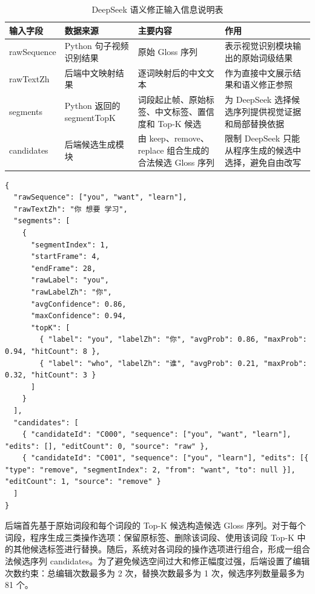 \begin{longtable}{L{0.20\textwidth} L{0.24\textwidth} L{0.28\textwidth} L{0.20\textwidth}}
  \caption{DeepSeek 语义修正输入信息说明表}
  \label{tab:chapter06-deepseek-input-fields}\\
  \toprule
  输入字段 & 数据来源 & 主要内容 & 作用 \\
  \midrule
  rawSequence & Python 句子视频识别结果 & 原始 Gloss 序列 & 表示视觉识别模块输出的原始词级结果 \\
  rawTextZh & 后端中文映射结果 & 逐词映射后的中文文本 & 作为直接中文展示结果和语义修正参照 \\
  segments & Python 返回的 segmentTopK & 词段起止帧、原始标签、中文标签、置信度和 Top-K 候选 & 为 DeepSeek 选择候选序列提供视觉证据和局部替换依据 \\
  candidates & 后端候选生成模块 & 由 keep、remove、replace 组合生成的合法候选 Gloss 序列 & 限制 DeepSeek 只能从程序生成的候选中选择，避免自由改写 \\
  \bottomrule
\end{longtable}

\begin{lstlisting}[style=whuCode,caption={DeepSeek 语义修正输入结构示例},label={lst:chapter06-deepseek-input-example}]
{
  "rawSequence": ["you", "want", "learn"],
  "rawTextZh": "你 想要 学习",
  "segments": [
    {
      "segmentIndex": 1,
      "startFrame": 4,
      "endFrame": 28,
      "rawLabel": "you",
      "rawLabelZh": "你",
      "avgConfidence": 0.86,
      "maxConfidence": 0.94,
      "topK": [
        { "label": "you", "labelZh": "你", "avgProb": 0.86, "maxProb": 0.94, "hitCount": 8 },
        { "label": "who", "labelZh": "谁", "avgProb": 0.21, "maxProb": 0.32, "hitCount": 3 }
      ]
    }
  ],
  "candidates": [
    { "candidateId": "C000", "sequence": ["you", "want", "learn"], "edits": [], "editCount": 0, "source": "raw" },
    { "candidateId": "C001", "sequence": ["you", "learn"], "edits": [{ "type": "remove", "segmentIndex": 2, "from": "want", "to": null }], "editCount": 1, "source": "remove" }
  ]
}
\end{lstlisting}

后端首先基于原始词段和每个词段的 Top-K 候选构造候选 Gloss 序列。对于每个词段，程序生成三类操作选项：保留原标签、删除该词段、使用该词段 Top-K 中的其他候选标签进行替换。随后，系统对各词段的操作选项进行组合，形成一组合法候选序列 candidates。为了避免候选空间过大和修正幅度过强，后端设置了编辑次数约束：总编辑次数最多为 2 次，替换次数最多为 1 次，候选序列数量最多为 81 个。

